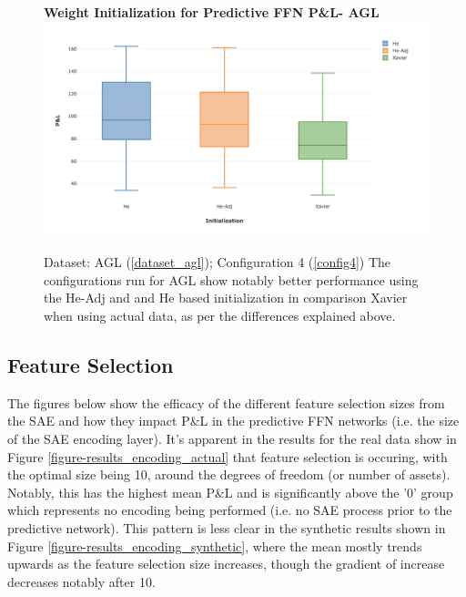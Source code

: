\documentclass[a4paper,11pt,oneside]{article}
\theoremstyle{plain}
\theoremstyle{definition}
\begin{document}
\begin{figure}[H]
	\centering 
	\textbf{Weight Initialization for Predictive FFN P\&L- AGL} 
		\includegraphics[scale=0.35]{images/results/init/AGL_pl.png}
	\caption{Dataset: AGL (\ref{dataset_agl}); Configuration 4 (\ref{config4})
		\newline The configurations run for AGL show notably better performance using the He-Adj and and He based initialization in comparison Xavier when using actual data, as per the differences explained above.}
	\label{figure-init5_ffn_init}
\end{figure}


\newpage
\subsection{Feature Selection}\label{results_reduction}

The figures below show the efficacy of the different feature selection sizes from the SAE and how they impact P\&L in the predictive FFN networks (i.e. the size of the SAE encoding layer). It's apparent in the results for the real data show in Figure \ref{figure-results_encoding_actual} that feature selection is occuring, with the optimal size being 10, around the degrees of freedom (or number of assets). Notably, this has the highest mean P\&L and is significantly above the '0' group which represents no encoding being performed (i.e. no SAE process prior to the predictive network). This pattern is less clear in the synthetic results shown in Figure \ref{figure-results_encoding_synthetic}, where the mean mostly trends upwards as the feature selection size increases, though the gradient of increase decreases notably after 10.\newline
\end{document}
